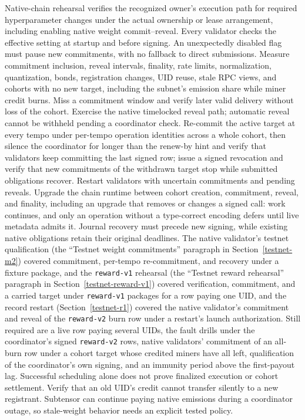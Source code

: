 Native-chain rehearsal verifies the recognized owner's execution path for
required hyperparameter changes under the actual ownership or lease arrangement,
including enabling native weight commit--reveal. Every validator checks the
effective setting at startup and before
signing. An unexpectedly disabled flag must pause new commitments, with no
fallback to direct submissions. Measure commitment inclusion, reveal intervals,
finality, rate limits, normalization, quantization, bonds, registration changes,
UID reuse, stale RPC views, and cohorts with no new target, including the
subnet's emission share while miner credit burns. Miss a commitment window and
verify later valid delivery without loss of the cohort. Exercise the native
timelocked reveal path; automatic reveal cannot be withheld pending a
coordinator check. Re-commit the active target at every tempo under per-tempo
operation identities across a whole cohort, then silence the coordinator for
longer than the renew-by hint and verify that validators keep committing the
last signed row; issue a signed revocation and verify that new commitments of
the withdrawn target stop while submitted obligations recover. Restart validators with uncertain
commitments and pending reveals. Upgrade the chain runtime between cohort
creation, commitment, reveal, and finality, including an upgrade that removes or
changes a signed call: work continues, and only an operation without a
type-correct encoding defers until live metadata admits it. Journal recovery
must precede new signing, while existing native obligations retain their
original deadlines. The native validator's testnet qualification
(the ``Testnet weight commitments'' paragraph in
Section~\ref{testnet-m2}) covered commitment, per-tempo re-commitment, and
recovery under a fixture package, and the \texttt{reward-v1} rehearsal
(the ``Testnet reward rehearsal'' paragraph in
Section~\ref{testnet-reward-v1}) covered verification, commitment, and a
carried target under \texttt{reward-v1} packages for a row paying one UID, and
the record restart (Section~\ref{testnet-r1}) covered the native validator's
commitment and reveal of the \texttt{reward-v2} burn row under a restart's
launch authorization.
Still required are a live row paying several UIDs, the fault drills under the
coordinator's signed \texttt{reward-v2} rows, native validators' commitment
of an all-burn row under a cohort target whose credited miners have all left,
qualification of the coordinator's own signing, and an immunity period above
the first-payout lag.
Successful scheduling alone does not prove finalized execution or cohort
settlement. Verify that an old UID's credit cannot transfer silently to a new
registrant. Subtensor can continue paying native emissions during a coordinator
outage, so stale-weight behavior needs an explicit tested policy.

